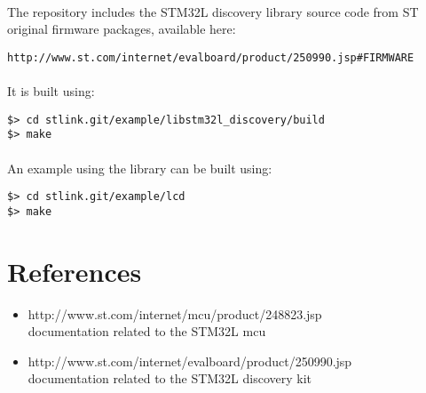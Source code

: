 \documentclass[a4paper, 11pt]{article}
\begin{document}
\paragraph{}
The repository includes the STM32L discovery library source code from ST original firmware packages,
available here:\\
\begin{small}
\begin{lstlisting}[frame=tb]
http://www.st.com/internet/evalboard/product/250990.jsp#FIRMWARE
\end{lstlisting}
\end{small}

\paragraph{}
It is built using:\\
\begin{small}
\begin{lstlisting}[frame=tb]
$> cd stlink.git/example/libstm32l_discovery/build
$> make
\end{lstlisting}
\end{small}

\paragraph{}
An example using the library can be built using:\\
\begin{small}
\begin{lstlisting}[frame=tb]
$> cd stlink.git/example/lcd
$> make
\end{lstlisting}
\end{small}


\newpage
\section{References}
\begin{itemize}
\item http://www.st.com/internet/mcu/product/248823.jsp\\
  documentation related to the STM32L mcu
\item http://www.st.com/internet/evalboard/product/250990.jsp\\
  documentation related to the STM32L discovery kit
\end{itemize}
\end{document}
